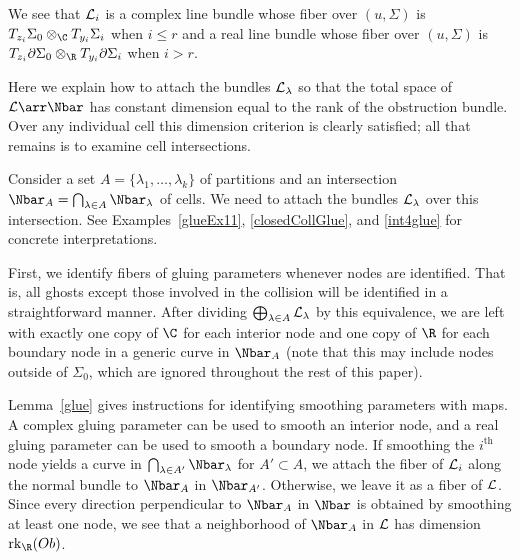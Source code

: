 \begin{remark} \label{howToGlue}
We see that $\mathcal{L}_i$ is a complex line bundle whose fiber over $(u,\Sigma)$ is $T_{z_i}\Sigma_0 \otimes_\C T_{y_i}\Sigma_i$ when $i \leq r$ and a real line bundle whose fiber over $(u,\Sigma)$ is $T_{z_i}\partial\Sigma_0 \otimes_\R T_{y_i}\partial\Sigma_i$ when $i>r$.

Here we explain how to attach the bundles $\mathcal{L}_{\lambda}$ so that the total space of $\L \arr \Nbar$ has constant dimension equal to the rank of the obstruction bundle. Over any individual cell this dimension criterion is clearly satisfied; all that remains is to examine cell intersections.

Consider a set $A=\{\lambda_1,\ldots,\lambda_k\}$ of partitions and an intersection $\Nbar_A= \bigcap_{\lambda \in A} \Nbar_{\lambda}$ of cells. We need to attach the bundles $\mathcal{L}_\lambda$ over this intersection. See Examples~\ref{glueEx11}, \ref{closedCollGlue}, and \ref{int4glue} for concrete interpretations.

First, we identify fibers of gluing parameters whenever nodes are identified. That is, all ghosts except those involved in the collision will be identified in a straightforward manner. After dividing $\bigoplus_{\lambda \in A} \mathcal{L}_{\lambda}$ by this equivalence, we are left with exactly one copy of $\C$ for each interior node and one copy of $\R$ for each boundary node in a generic curve in $\Nbar_A$ (note that this may include nodes outside of $\Sigma_0$, which are ignored throughout the rest of this paper).

Lemma~\ref{glue} gives instructions for identifying smoothing parameters with maps. A complex gluing parameter can be used to smooth an interior node, and a real gluing parameter can be used to smooth a boundary node. If smoothing the $i^{\text{th}}$ node yields a curve in $\bigcap_{\lambda \in A'} \Nbar_{\lambda}$ for $A' \subset A$, we attach the fiber of $\mathcal{L}_i$ along the normal bundle to $\Nbar_A$ in $\Nbar_{A'}$. Otherwise, we leave it as a fiber of $\mathcal{L}$. Since every direction perpendicular to $\Nbar_A$ in $\Nbar$ is obtained by smoothing at least one node, we see that a neighborhood of $\Nbar_A$ in $\mathcal{L}$ has dimension $\rk_\R(Ob)$.
\end{remark}

